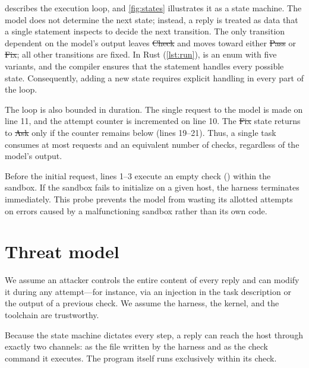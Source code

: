 \documentclass[10pt,twocolumn,a4paper]{article}
\begin{document}


 describes the execution loop, and \cref{fig:states} illustrates it as a state machine. The model does not determine the next state; instead, a reply is treated as data that a single  statement inspects to decide the next transition. The only transition dependent on the model's output leaves \st{Check} and moves toward either \st{Pass} or \st{Fix}; all other transitions are fixed. In Rust (\cref{lst:run}),  is an enum with five variants, and the compiler ensures that the  statement handles every possible state. Consequently, adding a new state requires explicit handling in every part of the loop.




The loop is also bounded in duration. The single request to the model is made on line 11, and the attempt counter is incremented on line 10. The \st{Fix} state returns to \st{Ask} only if the counter remains below  (lines 19--21). Thus, a single task consumes at most  requests and an equivalent number of checks, regardless of the model's output.

Before the initial request, lines 1--3 execute an empty check () within the sandbox. If the sandbox fails to initialize on a given host, the harness terminates immediately. This probe prevents the model from wasting its allotted attempts on errors caused by a malfunctioning sandbox rather than its own code.

\section{Threat model}
\label{sec:threats}

We assume an attacker controls the entire content of every reply and can modify it during any attempt—for instance, via an injection in the task description or the output of a previous check. We assume the harness, the kernel, and the toolchain are trustworthy.

\begin{observation}
Because the state machine dictates every step, a reply can reach the host through exactly two channels: as the file written by the harness and as the check command it executes. The program itself runs exclusively within its check.
\end{observation}
\end{document}
